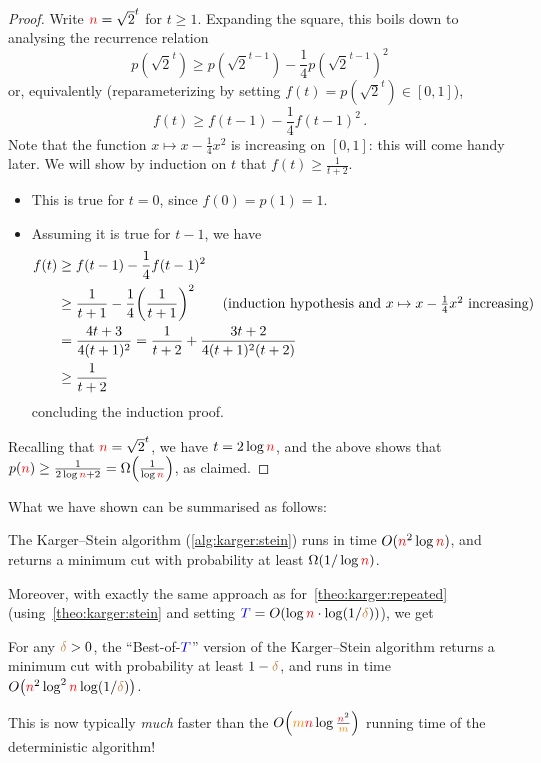 \begin{proof}
    Write ${\textcolor{red}{n}} = \sqrt{2}^t$ for $t\geq 1$.
    Expanding the square, this boils down to analysing the recurrence relation
    \[
        p(\sqrt{2}^t) \geq p(\sqrt{2}^{t-1}) - \frac{1}{4}p(\sqrt{2}^{t-1})^2
    \]
    or, equivalently (reparameterizing by setting $f(t) = p(\sqrt{2}^t)\in[0,1]$),
    \begin{equation}
        f(t) \geq f(t-1)-\frac{1}{4}f(t-1)^2\,.
    \end{equation}
    Note that the function $x\mapsto x-\frac{1}{4}x^2$ is increasing on $[0,1]$: this will come handy later. We will show by induction on $t$ that $f(t) \geq \frac{1}{t+2}$.
    \begin{itemize}
        \item This is true for $t=0$, since $f(0) = p(1)=1$.
        \item Assuming it is true for $t-1$, we have
        \begin{align*}
        f(t) &\geq f(t-1)-\frac{1}{4}f(t-1)^2 \\
        &\geq \frac{1}{t+1}-\frac{1}{4}\Paren{\frac{1}{t+1}}^2 \tag{induction hypothesis and $x\mapsto x-\frac{1}{4}x^2$ increasing} \\
        &= \frac{4t+3}{4(t+1)^2} = \frac{1}{t+2} + \frac{3t+2}{4(t+1)^2(t+2)} \\
        &\geq \frac{1}{t+2}
        \end{align*}
        concluding the induction proof.
    \end{itemize}
    Recalling that ${\textcolor{red}{n}} = \sqrt{2}^t$, we have $t = 2\log{\textcolor{red}{n}}$, and the above shows that $p(\ns) \geq \frac{1}{2\log\ns+2} = \bigOmega{\frac{1}{\log\ns}}$, as claimed.
\end{proof}
\noindent What we have shown can be summarised as follows:
\begin{theorem}
    \label{theo:karger:stein}
    The Karger--Stein algorithm (\cref{alg:karger:stein}) runs in time $O({\textcolor{red}{n}}^2\log{\textcolor{red}{n}})$, and returns a minimum cut with probability at least $\bigOmega{1/\log\ns}$.
\end{theorem}
Moreover, with exactly the same approach as for~\cref{theo:karger:repeated} (using~\cref{theo:karger:stein} and setting $\textcolor{blue}{T} = O(\log{\textcolor{red}{n}}\cdot \log(1/{\textcolor{brown}{\delta}}))$), we get
\begin{corollary}
    \label{theo:karger:stein:repeated}
    For any ${\textcolor{brown}{\delta}}>0$, the ``Best-of-$\textcolor{blue}{T}$'' version of the Karger--Stein algorithm returns a minimum cut with probability at least $1-{\textcolor{brown}{\delta}}$, and runs in time $\bigO{\ns^2\log^2\ns \log(1/\errprob)}$.
\end{corollary}
This is now typically \emph{much} faster than the $\bigO{\orange{m}\red{n}\log\frac{\red{n}^2}{\orange{m}}}$ running time of the deterministic algorithm!

